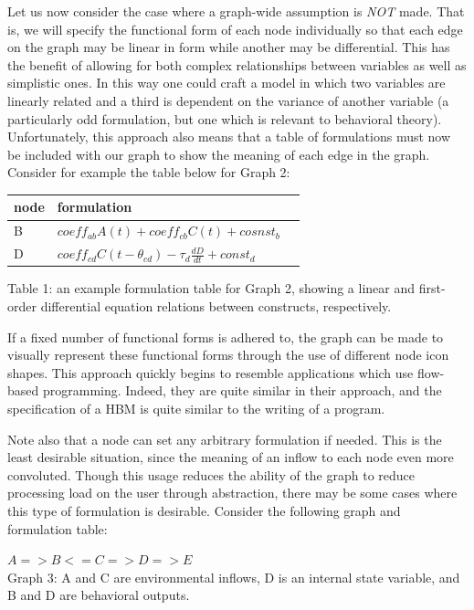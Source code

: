 \documentclass[runningheads,a4paper]{llncs}
\begin{document}
Let us now consider the case where a graph-wide assumption is \emph{NOT} made.
That is, we will specify the functional form of each node individually so that each edge on the graph may be linear in form while another may be differential.
This has the benefit of allowing for both complex relationships between variables as well as simplistic ones.
In this way one could craft a model in which two variables are linearly related and a third is dependent on the variance of another variable (a particularly odd formulation, but one which is relevant to behavioral theory).
Unfortunately, this approach also means that a table of formulations must now be included with our graph to show the meaning of each edge in the graph.
Consider for example the table below for Graph 2:

\begin{centering}
  \begin{tabular}{ | l | l | l |}
      \hline
      node & formulation \\ \hline
      B & $coeff_{ab}A(t) + coeff_{cb}C(t) + cosnst_b$  \\ \hline
      D & $coeff_{cd}C(t-\theta_{cd}) - \tau_{d}\frac{dD}{dt} + const_d$ \\ \hline
  \end{tabular}
  
  Table 1: an example formulation table for Graph 2, showing a linear and first-order differential equation relations between constructs, respectively.
\end{centering}

If a fixed number of functional forms is adhered to, the graph can be made to visually represent these functional forms through the use of different node icon shapes. 
This approach quickly begins to resemble applications which use flow-based programming. 
Indeed, they are quite similar in their approach, and the specification of a HBM is quite similar to the writing of a program.

Note also that a node can set any arbitrary formulation if needed. 
This is the least desirable situation, since the meaning of an inflow to each node even more convoluted. 
Though this usage reduces the ability of the graph to reduce processing load on the user through abstraction, there may be some cases where this type of formulation is desirable. 
Consider the following graph and formulation table:

\begin{centering}
$A => B <= C => D => E$\\
Graph 3: A and C are environmental inflows, D is an internal state variable, and B and D are behavioral outputs.
\end{centering}
\end{document}
